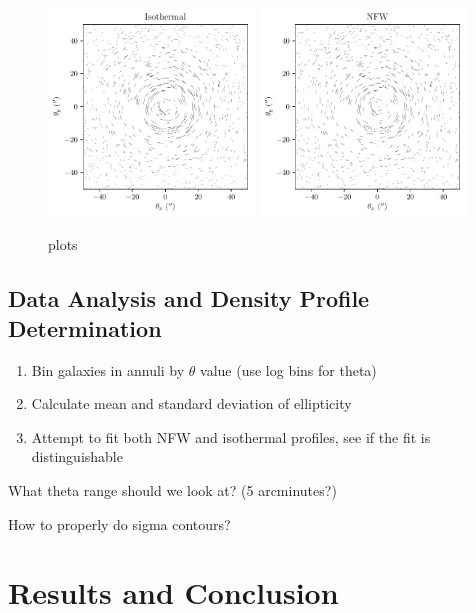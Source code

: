 \documentclass[10pt]{article}
\begin{document}
\begin{figure}
    \includegraphics[width=0.49\textwidth]{isothermalellipticities.pdf}
    \includegraphics[width=0.49\textwidth]{nfwellipticities.pdf}
    \caption{plots}
    \label{}
\end{figure}


\subsection{Data Analysis and Density Profile Determination}
\begin{enumerate}
\item Bin galaxies in annuli by $\theta$ value (use log bins for theta)
\item Calculate mean and standard deviation of ellipticity
\item Attempt to fit both NFW and isothermal profiles, see if the fit is distinguishable
\end{enumerate}

What theta range should we look at? (5 arcminutes?)

How to properly do sigma contours?

\section{Results and Conclusion}
\end{document}
